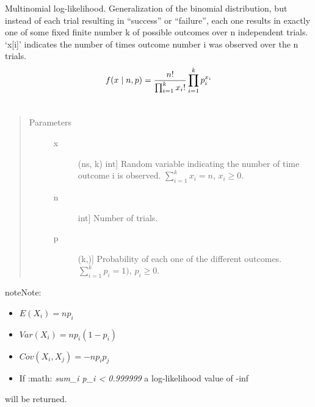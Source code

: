 \documentclass[letterpaper,10pt,english]{sphinxmanual}
\begin{document}
\begin{fulllineitems}
\label{distributions:pymc.distributions.multinomial_like}
Multinomial log-likelihood. Generalization of the binomial
distribution, but instead of each trial resulting in ``success'' or
``failure'', each one results in exactly one of some fixed finite number k
of possible outcomes over n independent trials. `x{[}i{]}' indicates the number
of times outcome number i was observed over the n trials.
\begin{gather}
\begin{split}f(x \mid n, p) = \frac{n!}{\prod_{i=1}^k x_i!} \prod_{i=1}^k p_i^{x_i}\end{split}\notag\\\begin{split}\end{split}\notag
\end{gather}\begin{quote}\begin{description}
\item[{Parameters }] \leavevmode\begin{description}
\item[{x}] \leavevmode{[}(ns, k) int{]}
Random variable indicating the number of time outcome i is
observed. $\sum_{i=1}^k x_i=n$, $x_i \ge 0$.

\item[{n}] \leavevmode{[}int{]}
Number of trials.

\item[{p}] \leavevmode{[}(k,){]}
Probability of each one of the different outcomes.
$\sum_{i=1}^k p_i = 1)$, $p_i \ge 0$.

\end{description}

\end{description}\end{quote}

\begin{notice}{note}{Note:}\begin{itemize}
\item {} 
$E(X_i)=n p_i$

\item {} 
$Var(X_i)=n p_i(1-p_i)$

\item {} 
$Cov(X_i,X_j) = -n p_i p_j$

\item {} 
If :math: \emph{sum\_i p\_i \textless{} 0.999999} a log-likelihood value of -inf

\end{itemize}

will be returned.
\end{notice}

\end{fulllineitems}
\end{document}
